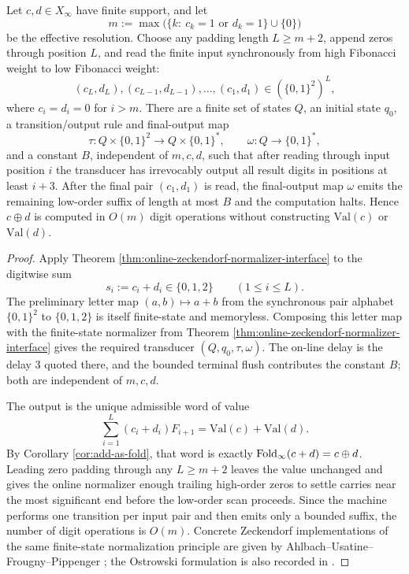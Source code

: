 \begin{theorem}\label{thm:zeckendorf-add-fst}
Let \(c,d\in X_\infty\) have finite support, and let
\[
m:=\max\bigl(\{k:\ c_k=1\text{ or }d_k=1\}\cup\{0\}\bigr)
\]
be the effective resolution. Choose any padding length \(L\ge m+2\), append zeros through position \(L\), and read the finite input synchronously from high Fibonacci weight to low Fibonacci weight:
\[
(c_L,d_L),(c_{L-1},d_{L-1}),\dots,(c_1,d_1)
\in(\{0,1\}^2)^L,
\]
where \(c_i=d_i=0\) for \(i>m\). There are a finite set of states \(Q\), an initial state \(q_0\), a transition/output rule and final-output map
\[
\tau:Q\times \{0,1\}^2\longrightarrow Q\times\{0,1\}^*,
\qquad
\omega:Q\longrightarrow \{0,1\}^*,
\]
and a constant \(B\), independent of \(m,c,d\), such that after reading through input position \(i\) the transducer has irrevocably output all result digits in positions at least \(i+3\). After the final pair \((c_1,d_1)\) is read, the final-output map \(\omega\) emits the remaining low-order suffix of length at most \(B\) and the computation halts. Hence \(c\oplus d\) is computed in \(O(m)\) digit operations without constructing \(\mathrm{Val}(c)\) or \(\mathrm{Val}(d)\).
\end{theorem}

\begin{proof}
Apply Theorem \ref{thm:online-zeckendorf-normalizer-interface} to the digitwise sum
\[
s_i:=c_i+d_i\in\{0,1,2\}\qquad(1\le i\le L).
\]
The preliminary letter map \((a,b)\mapsto a+b\) from the synchronous pair alphabet \(\{0,1\}^2\) to \(\{0,1,2\}\) is itself finite-state and memoryless. Composing this letter map with the finite-state normalizer from Theorem \ref{thm:online-zeckendorf-normalizer-interface} gives the required transducer \((Q,q_0,\tau,\omega)\). The on-line delay is the delay \(3\) quoted there, and the bounded terminal flush contributes the constant \(B\); both are independent of \(m,c,d\).

The output is the unique admissible word of value
\[
\sum_{i=1}^{L}(c_i+d_i)F_{i+1}
=\mathrm{Val}(c)+\mathrm{Val}(d).
\]
By Corollary \ref{cor:add-as-fold}, that word is exactly \(\operatorname{Fold}_\infty(c+d)=c\oplus d\). Leading zero padding through any \(L\ge m+2\) leaves the value unchanged and gives the online normalizer enough trailing high-order zeros to settle carries near the most significant end before the low-order scan proceeds. Since the machine performs one transition per input pair and then emits only a bounded suffix, the number of digit operations is \(O(m)\). Concrete Zeckendorf implementations of the same finite-state normalization principle are given by Ahlbach--Usatine--Frougny--Pippenger \cite{AhlbachUsatineFrougnyPippenger2013}; the Ostrowski formulation is also recorded in \cite{HieronymiTerry2018OstrowskiAddition}.
\end{proof}

